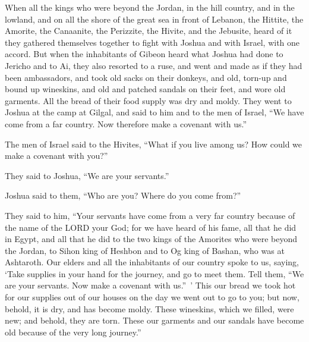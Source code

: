 \mychapter{} \myverse*{}When all the kings who were beyond the Jordan, in the hill country,
and in the lowland, and on all the shore of the great sea in front of Lebanon, the Hittite, the Amorite,
the Canaanite, the Perizzite, the Hivite, and the Jebusite, heard of it
\myverse{}they gathered themselves together to fight with Joshua and with Israel, with
one accord.
\myverse{}But when the inhabitants of Gibeon heard what Joshua had done to Jericho and
to Ai,
\myverse{}they also resorted to a ruse, and went and made as if they had been ambassadors,
and took old sacks on their donkeys, and old, torn-up and bound up wineskins,
\myverse{}and old and patched sandals on their feet, and wore old garments. All the bread
of their food supply was dry and moldy.
\myverse{}They went to Joshua at the camp at Gilgal, and said to him and to the men of
Israel, “We have come from a far country. Now therefore make a covenant with us.”

\myverse{}The men of Israel said to the Hivites, “What if you live among
us? How could we make a covenant with you?”

\myverse{}They said to Joshua, “We are your servants.”

Joshua said to them, “Who are you? Where do you come from?”

\myverse{}They said to him, “Your servants have come from a very far country
because of the name of the LORD your God; for we have heard of his fame, all that he did in Egypt,
\myverse{}and all that he did to the two kings of the Amorites who were beyond the Jordan,
to Sihon king of Heshbon and to Og king of Bashan, who was at Ashtaroth.
\myverse{}Our elders and all the inhabitants of our country spoke to us, saying, ‘Take
supplies in your hand for the journey, and go to meet them. Tell them, “We are your servants. Now make
a covenant with us.” ’
\myverse{}This our bread we took hot for our supplies out of our houses on the day we
went out to go to you; but now, behold, it is dry, and has become moldy.
\myverse{}These wineskins, which we filled, were new; and behold, they are torn. These
our garments and our sandals have become old because of the very long journey.”

